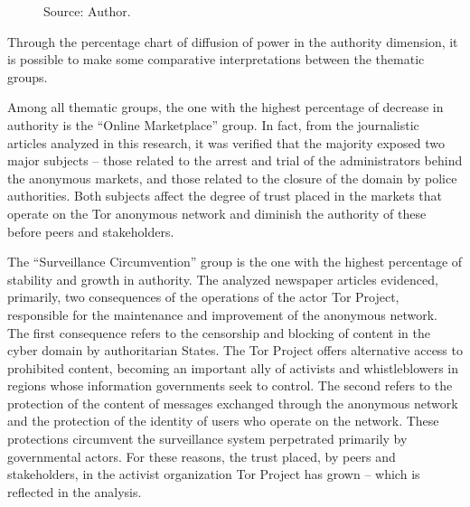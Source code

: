 \begin{figure}[H]
\caption*{Source: Author.}
\end{figure}

Through the percentage chart of diffusion of power in the authority dimension, it is possible to make some comparative interpretations between the thematic groups.

Among all thematic groups, the one with the highest percentage of decrease in authority is the ``Online Marketplace'' group. In fact, from the journalistic articles analyzed in this research, it was verified that the majority exposed two major subjects -- those related to the arrest and trial of the administrators behind the anonymous markets, and those related to the closure of the domain by police authorities. Both subjects affect the degree of trust placed in the markets that operate on the Tor anonymous network and diminish the authority of these before peers and stakeholders.

The ``Surveillance Circumvention'' group is the one with the highest percentage of stability and growth in authority. The analyzed newspaper articles evidenced, primarily, two consequences of the operations of the actor Tor Project, responsible for the maintenance and improvement of the anonymous network. The first consequence refers to the censorship and blocking of content in the cyber domain by authoritarian States. The Tor Project offers alternative access to prohibited content, becoming an important ally of activists and whistleblowers in regions whose information governments seek to control. The second refers to the protection of the content of messages exchanged through the anonymous network and the protection of the identity of users who operate on the network. These protections circumvent the surveillance system perpetrated primarily by governmental actors. For these reasons, the trust placed, by peers and stakeholders, in the activist organization Tor Project has grown -- which is reflected in the analysis.

